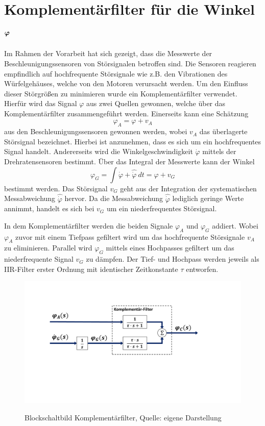 \section{Komplementärfilter für die Winkel $\boldsymbol{\varphi}$}
Im Rahmen der Vorarbeit hat sich gezeigt, dass die Messwerte der Beschleunigungssensoren von Störsignalen betroffen sind. Die Sensoren reagieren empfindlich auf hochfrequente Störsignale wie z.B. den Vibrationen des Würfelgehäuses, welche von den Motoren verursacht werden. Um den Einfluss dieser Störgrößen zu minimieren wurde ein Komplementärfilter verwendet. Hierfür wird das Signal $\varphi$ aus zwei Quellen gewonnen, welche über das Komplementärfilter zusammengeführt werden. Einerseits kann eine Schätzung
\begin{equation}
\varphi_A = \varphi + v_A
\end{equation}
aus den Beschleunigungssensoren gewonnen werden, wobei $v_A$ das überlagerte Störsignal bezeichnet. Hierbei ist anzunehmen, dass es sich um ein hochfrequentes Signal handelt. Andererseits wird die Winkelgeschwindigkeit $\dot{\varphi}$ mittels der Drehratensensoren bestimmt. Über das Integral der Messwerte kann der Winkel
\begin{equation}
\varphi_G = \int \dot{\varphi} + \hat{\dot{\varphi}}\ dt = \varphi + v_G 
\end{equation}
bestimmt werden. Das Störsignal $v_G$ geht aus der Integration der systematischen Messabweichung $\hat{\dot{\varphi}}$ hervor. Da die Messabweichung $\hat{\dot{\varphi}}$ lediglich geringe Werte annimmt, handelt es sich bei $v_G$ um ein niederfrequentes Störsignal.

In dem Komplementärfilter werden die beiden Signale $\varphi_A$ und $\varphi_G$ addiert. Wobei $\varphi_A$ zuvor mit einem Tiefpass gefiltert wird um das hochfrequente Störsignale $v_A$ zu eliminieren. Parallel wird $\varphi_G$ mittels eines Hochpasses gefiltert um das niederfrequente Signal $v_G$ zu dämpfen. Der Tief- und Hochpass werden jeweils als IIR-Filter erster Ordnung mit identischer Zeitkonstante $\tau$ entworfen.
\begin{figure}[h!]
\includegraphics[width=1\linewidth, trim={2cm 7.5cm 4cm 3.5cm}, clip]{img/CompFilter}
\label{bsb_kompfilter}
\caption{Blockschaltbild Komplementärfilter, Quelle: eigene Darstellung}
\end{figure}

